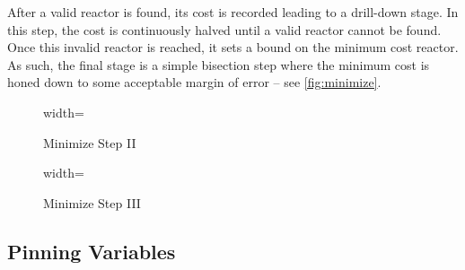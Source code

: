 %	

After a valid reactor is found, its cost is recorded leading to a drill-down stage. In this step, the cost is continuously halved until a valid reactor cannot be found. Once this invalid reactor is reached, it sets a bound on the minimum cost reactor. As such, the final stage is a simple bisection step where the minimum cost is honed down to some acceptable margin of error -- see \cref{fig:minimize}.

\begin{figure*}
    \centering
    \begin{subfigure}[t]{0.8\textwidth}
        \centering
		\begin{adjustbox}{width=\textwidth}
			
		\end{adjustbox}
        \caption{ Minimize Step II }
    \end{subfigure} 
    \par \bigskip \par \bigskip 
    \begin{subfigure}[t]{0.8\textwidth}
        \centering
		\begin{adjustbox}{width=\textwidth}
			
		\end{adjustbox}
        \caption{ Minimize Step III }
    \end{subfigure}
    \par \bigskip \par \bigskip    
    \caption{Minimize Cost Step II/III -- Optimize Reactor}
    \label{fig:minimize} 
\end{figure*}

\subsection{Pinning  Variables} 


